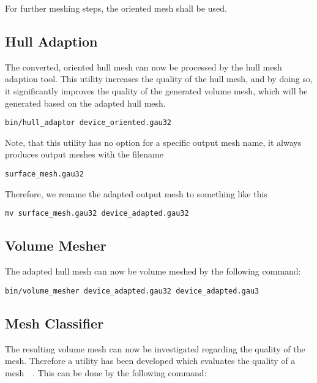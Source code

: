 For further meshing steps, the oriented mesh shall be used.

\newpage

\subsection{Hull Adaption}
The converted, oriented hull mesh can now be processed by the hull mesh adaption 
tool. This utility increases the quality of the hull mesh, and by doing so, 
it significantly improves the quality of the generated volume mesh, which will 
be generated based on the adapted hull mesh.

\begin{exaipd}
\begin{Verbatim}
bin/hull_adaptor device_oriented.gau32
\end{Verbatim}
\end{exaipd}

Note, that this utility has no option for a specific output mesh name, it 
always produces output meshes with the filename

\begin{exaipd}
\begin{Verbatim}
surface_mesh.gau32
\end{Verbatim}
\end{exaipd}

Therefore, we rename the adapted output mesh to something like this

\begin{exaipd}
\begin{Verbatim}
mv surface_mesh.gau32 device_adapted.gau32
\end{Verbatim}
\end{exaipd}

\subsection{Volume Mesher}
The adapted hull mesh can now be volume meshed by the following command:

\begin{exaipd}
\begin{Verbatim}
bin/volume_mesher device_adapted.gau32 device_adapted.gau3
\end{Verbatim}
\end{exaipd}

\subsection{Mesh Classifier}
The resulting volume mesh can now be investigated regarding the quality 
of the mesh. Therefore a utility has been developed which evaluates 
the quality of a mesh~\cite{heinzlgen}~\cite{stimpflmulti}. 
This can be done by the following command:

